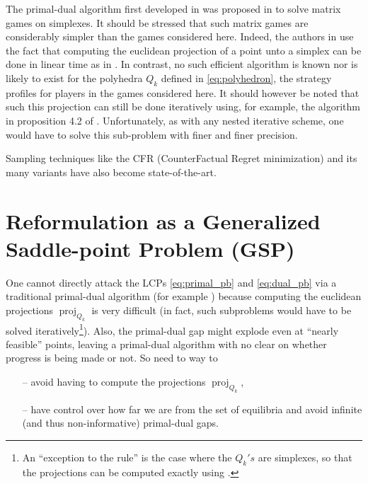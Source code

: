 \documentclass{article} %
\DeclareMathOperator{\proj}{proj}
\begin{document}
The primal-dual algorithm first developed in \cite{chambolle2010} was
proposed \cite{chambolle2014ergodic} in to solve matrix games on
simplexes. It should be stressed that such matrix games are
considerably simpler than the games considered here. Indeed, the
authors in \cite{chambolle2014ergodic} use the fact that computing the
euclidean projection of a point unto a simplex can be done in linear
time as in \cite{duchi2008efficient}. In contrast, no such efficient
algorithm is known nor is likely to exist for the polyhedra $Q_k$
defined in \eqref{eq:polyhedron}, the strategy profiles for players in
the games considered here. It should however be noted that such this
projection can still be done iteratively using, for example, the
algorithm in proposition 4.2 of \cite{combettes2010dualization}%
. Unfortunately, as
with any nested iterative scheme, one would have to solve this
sub-problem with finer and finer precision.


Sampling techniques like the CFR (CounterFactual Regret minimization)
and its many variants
\cite{MartinZinkevichNIPS2007,lanctot2009monte,Bowling09012015} have
also become state-of-the-art.


\section{Reformulation as a Generalized Saddle-point Problem (GSP)}
\label{sec:gsp}
One cannot directly attack the LCPs \eqref{eq:primal_pb} and
\eqref{eq:dual_pb} via a traditional primal-dual algorithm
(for example \cite{chambolle2010,chambolle2014ergodic}) because
computing the euclidean projections $\proj_{Q_k}$ is very difficult
(in fact, such subproblems would have to be solved
iteratively\footnote{An ``exception to the rule'' is the case where
  the $Q_k's$ are simplexes, so that the projections can be computed
  exactly using \cite{duchi2008efficient}.}). Also,
the primal-dual gap might explode even at ``nearly feasible'' points,
leaving a primal-dual algorithm with no clear on whether progress is
being made or not. So need to way to
\begin{itemize}
\item[--] avoid having to compute the projections $\proj_{Q_k}$,
\item[--] have control over how far we are from the set of equilibria and
  avoid infinite (and thus non-informative) primal-dual gaps.
\end{itemize}
\end{document}
